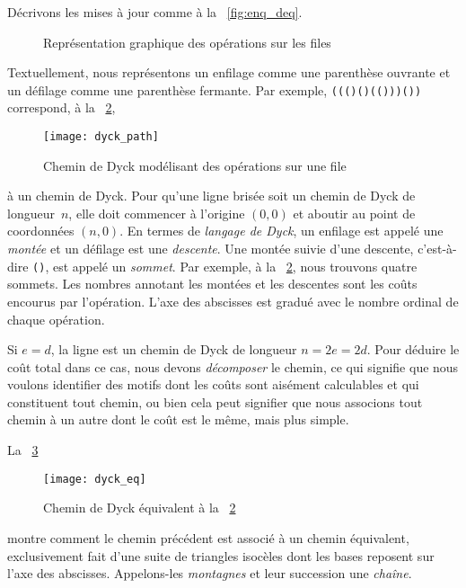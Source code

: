 Décrivons les mises à jour comme à la \fig~\vref{fig:enq_deq}.
\begin{figure}
\centering
{}
\qquad
{}
\caption{Représentation graphique des opérations sur les files}
\label{fig:enq_deq}
\end{figure}
Textuellement, nous représentons un enfilage comme une parenthèse
ouvrante et un défilage comme une parenthèse fermante. Par exemple,
\texttt{((()()(()))())} correspond, à la \fig~\ref{fig:dyck_path},
\begin{figure}
\centering
\texttt{[image: dyck\_path]}
\caption{Chemin de Dyck modélisant des opérations sur une file}
\label{fig:dyck_path}
\end{figure}
à un chemin de Dyck. Pour qu'une ligne brisée
soit un chemin de Dyck de longueur~\(n\), elle doit commencer à
l'origine \((0,0)\) et aboutir au point de coordonnées \((n,0)\). En
termes de \emph{langage de Dyck}, un enfilage est appelé une
\emph{montée} et un défilage est une
\emph{descente}. Une montée suivie
d'une descente, c'est-à-dire \texttt{()}, est appelé un
\emph{sommet}. Par exemple, à la
\fig~\ref{fig:dyck_path}, nous trouvons quatre sommets. Les nombres
annotant les montées et les descentes sont les coûts encourus par
l'opération. L'axe des abscisses est gradué avec le nombre ordinal de
chaque opération.

Si \(e=d\), la ligne est un chemin de Dyck de longueur
\(n=2e=2d\). Pour déduire le coût total dans ce cas, nous devons
\emph{décomposer} le chemin, ce
qui signifie que nous voulons identifier des motifs dont les coûts
sont aisément calculables et qui constituent tout chemin, ou bien cela
peut signifier que nous associons tout chemin à un autre dont le coût
est le même, mais plus simple.

La \fig~\ref{fig:dyck_eq}
\begin{figure}
\centering
\texttt{[image: dyck\_eq]}
\caption{Chemin de Dyck équivalent à la \fig~\ref{fig:dyck_path}}
\label{fig:dyck_eq}
\end{figure}
montre comment le chemin précédent est associé à un chemin équivalent,
exclusivement fait d'une suite de triangles isocèles dont les bases
reposent sur l'axe des abscisses. Appelons-les
\emph{montagnes} et leur succession une
\emph{chaîne}.

